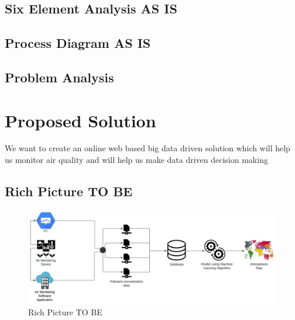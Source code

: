 \vspace{0.5cm}
\subsection{Six Element Analysis AS IS}
\vspace{0.5cm}




\vspace{0.5cm}
\subsection{Process Diagram AS IS}
\vspace{0.5cm}

\vspace{0.5cm}
\subsection{Problem Analysis}
\vspace{0.5cm}

\vspace{0.5cm}
\section{Proposed Solution}
\vspace{0.5cm}

We want to create an online web based big data driven solution which will help us monitor air quality and will help us make data driven decision making 

\vspace{0.5cm}
\subsection{Rich Picture TO BE}
\vspace{0.5cm}

\begin{figure} [H]
    \centering
    \includegraphics[width=.8\textwidth]{images/1_1_System Design AQM.jpeg}
    \caption{Rich Picture TO BE}
    \label{fig:Rich Picture TO BE}
\end{figure}

